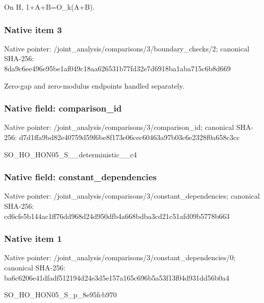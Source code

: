 \documentclass[10pt,a4paper]{article}
\begin{document}
\begingroup\raggedright\sloppy On H,\allowbreak{} 1+A+B=\allowbreak{}O\_\allowbreak{}k(A+B).\par\endgroup

\subsubsection{Native item 3}
Native pointer: /joint\_\allowbreak{}analysis/comparisons/3/boundary\_\allowbreak{}checks/2; canonical SHA-256: 8da9c6ee496e95be1af049c18aa626531b77fd32e7d6918ba1aba715c6b8d669

\begingroup\raggedright\sloppy Zero-gap and zero-modulus endpoints handled separately.\par\endgroup

\subsubsection{Native field: comparison\_\allowbreak{}id}
Native pointer: /joint\_\allowbreak{}analysis/comparisons/3/comparison\_\allowbreak{}id; canonical SHA-256: d7d1ffa9bd82e40759d59f6be8f173e06cec60463a97b03c6e2328f0a658c3cc

\begingroup\raggedright\sloppy SO\_\allowbreak{}HO\_\allowbreak{}HON05\_\allowbreak{}S\_\allowbreak{}\_\allowbreak{}deterministic\_\allowbreak{}\_\allowbreak{}c4\par\endgroup

\subsubsection{Native field: constant\_\allowbreak{}dependencies}
Native pointer: /joint\_\allowbreak{}analysis/comparisons/3/constant\_\allowbreak{}dependencies; canonical SHA-256: cd6cfe5b144ac1ff76dd968d24d950dfb4a668bdba3cd21c51afd09b5778b663

\subsubsection{Native item 1}
Native pointer: /joint\_\allowbreak{}analysis/comparisons/3/constant\_\allowbreak{}dependencies/0; canonical SHA-256: ba6c6206e41dfadf512194d24e3d5e157a165c696b5a53f13f04d931dd56b0a4

\begingroup\raggedright\sloppy SO\_\allowbreak{}HO\_\allowbreak{}HON05\_\allowbreak{}S\_\allowbreak{}p\_\allowbreak{}8e95fcb970\par\endgroup
\end{document}
